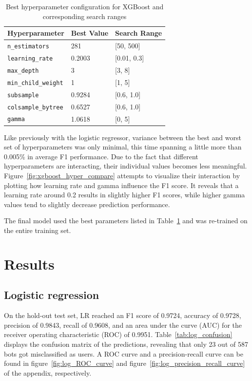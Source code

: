 \documentclass[twocolumn]{article}
\begin{document}
\begin{table}[H]
\centering
\caption{Best hyperparameter configuration for XGBoost and corresponding search ranges}
\label{tab:xgb_best_params}
\begin{tabular}{lll}
\toprule
\textbf{Hyperparameter} & \textbf{Best Value} & \textbf{Search Range} \\
\midrule
\texttt{n\_estimators}       & 281     & [50, 500] \\
\texttt{learning\_rate}      & 0.2003  & [0.01, 0.3] \\
\texttt{max\_depth}          & 3       & [3, 8] \\
\texttt{min\_child\_weight}  & 1       & [1, 5] \\
\texttt{subsample}          & 0.9284  & [0.6, 1.0] \\
\texttt{colsample\_bytree}   & 0.6527  & [0.6, 1.0] \\
\texttt{gamma}              & 1.0618  & [0, 5] \\
\bottomrule
\end{tabular}
\end{table}

Like previously with the logistic regressor, variance between the best and worst set of hyperparameters was only minimal, this time spanning a little more than 0.005\% in average F1 performance. Due to the fact that different hyperparameters are interacting, their individual values becomes less meaningful. Figure~\ref{fig:xgboost_hyper_compare} attempts to visualize their interaction by plotting how learning rate and gamma influence the F1 score. It reveals that a learning rate around 0.2 results in slightly higher F1 scores, while higher gamma values tend to slightly decrease prediction performance.

The final model used the best parameters listed in Table~\ref{tab:xgb_best_params} and was re-trained on the entire training set.

\section{Results}

\subsection{Logistic regression}
On the hold-out test set, LR reached an F1 score of 0.9724, accuracy of 0.9728, precision of 0.9843, recall of 0.9608, and an area under the curve (AUC) for the receiver operating characteristic (ROC) of 0.9951. Table~\ref{tab:log_confusion} displays the confusion matrix of the predictions, revealing that only 23 out of 587 bots got misclassified as users. A ROC curve and a precision-recall curve can be found in figure~\ref{fig:log_ROC_curve} and figure~\ref{fig:log_precision_recall_curve} of the appendix, respectively.
\end{document}
